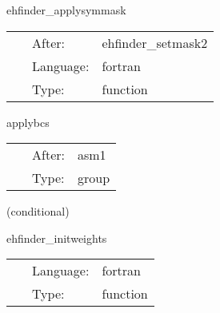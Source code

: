 \vspace{5mm}


\hspace{5mm} ehfinder\_applysymmask 

\hspace{5mm}{\it select eh\_mask for boundary conditions } 


\hspace{5mm}

 \begin{tabular*}{160mm}{cll} 
~ & After:  & ehfinder\_setmask2 \\ 
~ & Language:  & fortran \\ 
~ & Type:  & function \\ 
\end{tabular*} 


\vspace{5mm}


\hspace{5mm} applybcs 

\hspace{5mm}{\it apply boundary conditions (symmetries) } 


\hspace{5mm}

 \begin{tabular*}{160mm}{cll} 
~ & After:  & asm1 \\ 
~ & Type:  & group \\ 
\end{tabular*} 


\vspace{5mm}

   (conditional) 

\hspace{5mm} ehfinder\_initweights 

\hspace{5mm}{\it setup weights for simpson integration } 


\hspace{5mm}

 \begin{tabular*}{160mm}{cll} 
~ & Language:  & fortran \\ 
~ & Type:  & function \\ 
\end{tabular*} 


\vspace{5mm}

